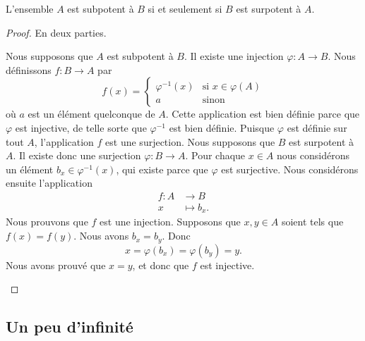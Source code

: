 \begin{proposition}      \label{PROPooWSXTooMQPcNG}
	L'ensemble \( A\) est subpotent à \( B\) si et seulement si \( B\) est surpotent à \( A\).
\end{proposition}

\begin{proof}
	En deux parties.
	\begin{subproof}
		\spitem[\( \Rightarrow\)]
		Nous supposons que \( A\) est subpotent à \( B\). Il existe une injection \( \varphi\colon A\to B\). Nous définissons \( f\colon B\to A\) par
		\begin{equation}
			f(x)=\begin{cases}
				\varphi^{-1}(x) & \text{si } x\in\varphi(A) \\
				a               & \text{sinon }
			\end{cases}
		\end{equation}
		où \( a\) est un élément quelconque de \( A\). Cette application est bien définie parce que \( \varphi\) est injective, de telle sorte que \( \varphi^{-1}\) est bien définie. Puisque \( \varphi\) est définie sur tout \( A\), l'application \( f\) est une surjection.
		\spitem[\( \Leftarrow\)]
		Nous supposons que \( B\) est surpotent à \( A\). Il existe donc une surjection \( \varphi\colon B\to A\). Pour chaque \( x\in A\) nous considérons un élément \( b_x\in \varphi^{-1}(x)\), qui existe parce que \( \varphi\) est surjective. Nous considérons ensuite l'application
		\begin{equation}
			\begin{aligned}
				f\colon A & \to B        \\
				x         & \mapsto b_x.
			\end{aligned}
		\end{equation}
		Nous prouvons que \( f\) est une injection. Supposons que \( x,y\in A\) soient tels que \( f(x)=f(y)\). Nous avons \( b_x=b_y\). Donc
		\begin{equation}
			x=\varphi(b_x)=\varphi(b_y)=y.
		\end{equation}
		Nous avons prouvé que \( x=y\), et donc que \( f\) est injective.
	\end{subproof}
\end{proof}

\subsection{Un peu d'infinité}
\label{SUBooCardinalInfini}

